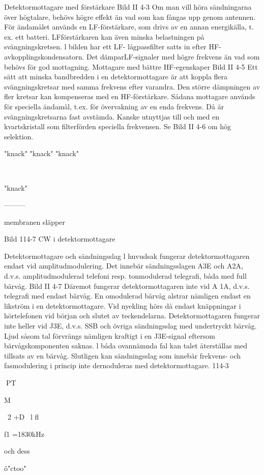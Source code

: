 Detektormottagare med förstärkare
Bild II 4-3
Om man vill höra sändningarna över högtalare, behövs högre effekt än vad som kan
fångas upp genom antennen. För ändamålet används en LF-förstärkare, som drivs av
en annan energikälla, t. ex. ett batteri. LFförstärkaren kan även minska belastningen
på svängningskretsen.
l bilden har ett LF- lågpassfilter satts in
efter HF-avkopplingskondensatorn. Det
dämparLF-signaler med högre frekvens än
vad som behövs för god mottagning.
Mottagare med bättre HF-egenskaper
Bild II 4-5
Ett sätt att minska bandbredden i en detektormottagare är att koppla flera svängningskretsar med samma frekvens efter varandra. Den större dämpningen av fler kretsar
kan kompenseras med en HF-förstärkare.
Sådana mottagare används för speciella
ändamål, t.ex. för övervakning av en enda
frekvens. Då är svängningskretsarna fast
avstämda. Kanske utnyttjas till och med en
kvartskristall som filterförden speciella frekvensen. Se Bild II 4-6 om hög selektion.

"knack" "knack" "knack"

\

"knack"

---------

membranen släpper

Bild 114-7 CW i detektormottagare

Detektormottagare och sändningsslag
l huvudsak fungerar detektormottagaren endast vid amplitudmodulering. Det innebär
sändningsslagen A3E och A2A, d.v.s. amplitudmodulerad telefoni resp. tonmodulerad
telegrafi, båda med full bärvåg.
Bild II 4-7 Däremot fungerar detektormottagaren inte vid A 1A, d.v.s. telegrafi med
endast bärvåg. En omodulerad bärvåg alstrar nämligen endast en likström i en
detektormottagare. Vid nyekling hörs då
endast knäppningar i hörtelefonen vid början och slutet av teckendelarna.
Detektormottagaren fungerar inte heller
vid J3E, d.v.s. SSB och övriga sändningsslag med undertryckt bärvåg. Ljud såsom tal
förvrängs nämligen kraftigt i en J3E-signal
eftersom bärvågskomponenten saknas.
l båda ovannämnda fal kan talet återställas med tillsats av en bärvåg.
Slutligen kan sändningsslag som innebär frekvens- och fasmodulering i princip
inte dernoduleras med detektormottagare.
114-3

PT

M

~2 +D
~l
fl

f1 =1830kHz

och dess

ö"ctoo"

